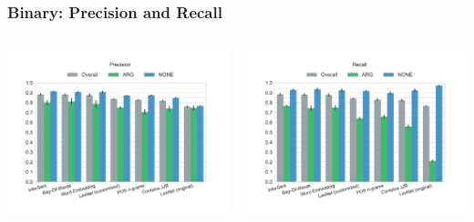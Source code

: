 \documentclass[11pt,aspectratio=169]{beamer}
\begin{document}
    \begin{frame}
        \frametitle{Binary: Precision and Recall}
        \begin{columns}[t]
            \column{2in}
            \centerline{\includegraphics[scale=0.31,trim={2cm 0 0 0},clip]{images/experiments/p-precision-True}}
            \column{2in}
            \centerline{\includegraphics[scale=0.31,trim={0 0 2cm 0},clip]{images/experiments/p-recall-True}}

        \end{columns}
    \end{frame}
\end{document}
